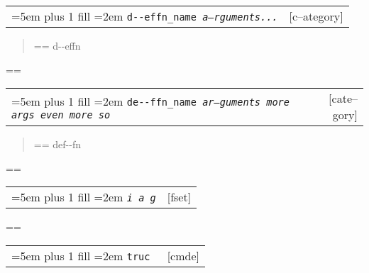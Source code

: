 \documentclass{book}
\makeatletter
\newcommand\GNUTexinfocommandstyletextvar[1]{{\normalfont{}\textsl{#1}}}%
\newenvironment{GNUTexinfopreformatted}{%
  \par\GNUTobeylines\obeyspaces\frenchspacing
  \parskip=\z@\parindent=\z@}{}
{\catcode`\^^M=13 \gdef\GNUTobeylines{\catcode`\^^M=13 \def^^M{\null\par}}}
\newenvironment{GNUTexinfoindented}
  {\begin{list}{}{}
  \item\relax}
  {\end{list}}
\makeatother
\begin{document}
\begin{GNUTexinfoindented}
\noindent\begin{tabularx}{\linewidth}{@{}Xr}
\rightskip=5em plus 1 fill
\hangindent=2em
\texttt{d{-}{-}effn\_name \EmbracOn{}\textnormal{\textsl{a--rguments...}}\EmbracOff{}}& [c--ategory]
\end{tabularx}

%
\begin{quote}
\unskip{\parskip=0pt\noindent}%
\begin{GNUTexinfopreformatted}%
\ttfamily d{-}{-}effn
\end{GNUTexinfopreformatted}
\end{quote}
\begin{GNUTexinfopreformatted}%
\ttfamily 
\end{GNUTexinfopreformatted}

\noindent\begin{tabularx}{\linewidth}{@{}Xr}
\rightskip=5em plus 1 fill
\hangindent=2em
\texttt{de{-}{-}ffn\_name \EmbracOn{}\textnormal{\textsl{ar--guments    more args   even more so}}\EmbracOff{}}& [cate--gory]
\end{tabularx}

%
\begin{quote}
\unskip{\parskip=0pt\noindent}%
\begin{GNUTexinfopreformatted}%
\ttfamily def{-}{-}fn
\end{GNUTexinfopreformatted}
\end{quote}
\begin{GNUTexinfopreformatted}%
\ttfamily 
\end{GNUTexinfopreformatted}

\noindent\begin{tabularx}{\linewidth}{@{}Xr}
\rightskip=5em plus 1 fill
\hangindent=2em
\texttt{\GNUTexinfocommandstyletextvar{i} \EmbracOn{}\textnormal{\textsl{a g}}\EmbracOff{}}& [fset]
\end{tabularx}

\index[fn]{i@\texttt{\GNUTexinfocommandstyletextvar{i}}}%
\begin{GNUTexinfopreformatted}%
\ttfamily {}%
\end{GNUTexinfopreformatted}

\noindent\begin{tabularx}{\linewidth}{@{}Xr}
\rightskip=5em plus 1 fill
\hangindent=2em
\texttt{truc \EmbracOn{}\textnormal{\textsl{}}\EmbracOff{}}& [cmde]
\end{tabularx}


\end{GNUTexinfoindented}
\end{document}
